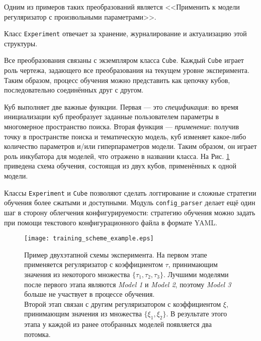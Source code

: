 Одним из примеров таких преобразований является <<Применить к модели регуляризатор с произвольными параметрами>>. 

Класс \texttt{Experiment} отвечает за хранение, журналирование и актуализацию этой структуры.  

Все преобразования связаны с экземпляром класса \texttt{Cube}. Каждый \texttt{Cube} играет роль чертежа, задающего все преобразования на текущем уровне эксперимента. Таким образом, процесс обучения можно представить как цепочку кубов, последовательно соединённых друг с другом.  

Куб выполняет две важные функции. Первая --- это \textit{спецификация}: во время инициализации куб преобразует заданные пользователем параметры в многомерное пространство поиска. Вторая функция --- \textit{применение}: получив точку в пространстве поиска и тематическую модель, куб изменяет какое-либо количество параметров и/или гиперпараметров модели. Таким образом, он играет роль инкубатора для моделей, что отражено в названии класса. На Рис.  \ref{Training-scheme} приведена схема обучения, состоящая из двух кубов, применённых к одной модели.  

Классы \texttt{Experiment} и \texttt{Cube} позволяют сделать логгирование и сложные стратегии обучения более сжатыми и доступными. Модуль \texttt{config\_parser} делает ещё один шаг в сторону облегчения конфигурируемости: стратегию обучения можно задать при помощи текстового конфигурационного файла в формате YAML.  

\begin{figure}[ht]
    \centering
    \captionsetup{justification=raggedright,singlelinecheck=false,format=hang}

    \texttt{[image: training\_scheme\_example.eps]}

    \caption{
        Пример двухэтапной схемы эксперимента.
        На первом этапе применяется регуляризатор с коэффициентом $\tau$, принимающим значения из некоторого множества $\{\tau_1, \tau_2, \tau_3\}$.
        Лучшими моделями после первого этапа являются \emph{Model 1} и \emph{Model 2}, поэтому \emph{Model 3} больше не участвует в процессе обучения.\\
        Второй этап связан с другим регуляризатором с коэффициентом $\xi$, принимающим значения из множества $\{\xi_1, \xi_2\}$.
        В результате этого этапа у каждой из ранее отобранных моделей  появляется два потомка.
    }
\label{Training-scheme}
\end{figure} 


